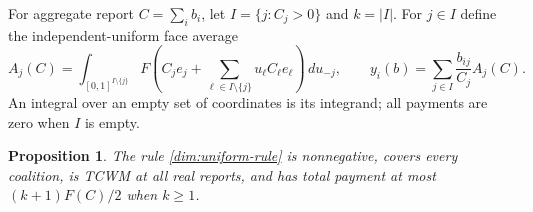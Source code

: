 \documentclass[11pt]{article}
\newtheorem{proposition}[theorem]{Proposition}
\theoremstyle{definition}\newtheorem{definition}[theorem]{Definition}
\theoremstyle{remark}\newtheorem{remark}[theorem]{Remark}
\begin{document}
For aggregate report $C=\sum_i b_i$, let $I=\{j:C_j>0\}$ and $k=|I|$.
For $j\in I$ define the independent-uniform face average
\begin{equation}\label{dim:uniform-rule}
 A_j(C)=\int_{[0,1]^{I\setminus\{j\}}}
 F\left(C_j e_j+\sum_{\ell\in I\setminus\{j\}}u_\ell C_\ell e_\ell\right)
 \,du_{-j},\qquad
 y_i(b)=\sum_{j\in I}\frac{b_{ij}}{C_j}A_j(C).
\end{equation}
An integral over an empty set of coordinates is its integrand; all payments
are zero when $I$ is empty.

\begin{proposition}\label{dim:uniform-upper}
The rule \eqref{dim:uniform-rule} is nonnegative, covers every coalition,
is TCWM at all real reports, and has total payment at most
$(k+1)F(C)/2$ when $k\ge1$.
\end{proposition}
\end{document}
